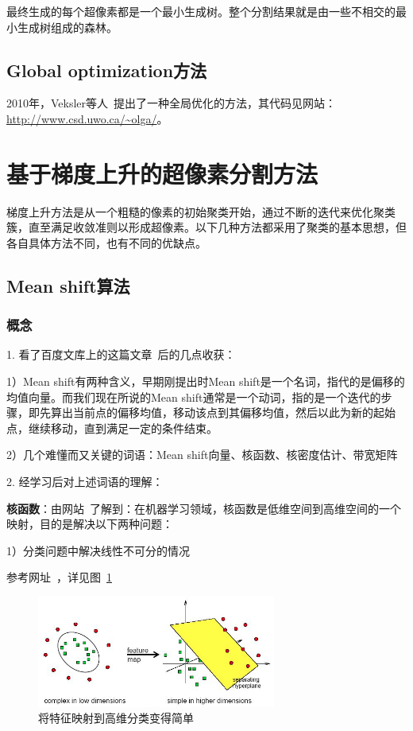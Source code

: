 \documentclass[12pt]{article}
\begin{document}
最终生成的每个超像素都是一个最小生成树。整个分割结果就是由一些不相交的最小生成树组成的森林。

\subsection{Global optimization方法}

2010年，Veksler等人~\cite{veksler2010superpixels}提出了一种全局优化的方法，其代码见网站：\url{http://www.csd.uwo.ca/~olga/}。

\section{基于梯度上升的超像素分割方法}

梯度上升方法是从一个粗糙的像素的初始聚类开始，通过不断的迭代来优化聚类簇，直至满足收敛准则以形成超像素。以下几种方法都采用了聚类的基本思想，但各自具体方法不同，也有不同的优缺点。

\subsection{Mean shift算法}

\subsubsection{概念}

1. 看了百度文库上的这篇文章~\cite{MeanShiftIntroduction}后的几点收获：

1）Mean shift有两种含义，早期刚提出时Mean shift是一个名词，指代的是偏移的均值向量。而我们现在所说的Mean shift通常是一个动词，指的是一个迭代的步骤，即先算出当前点的偏移均值，移动该点到其偏移均值，然后以此为新的起始点，继续移动，直到满足一定的条件结束。

2）几个难懂而又关键的词语：Mean shift向量、核函数、核密度估计、带宽矩阵

2. 经学习后对上述词语的理解： 

\textbf{核函数}：由网站~\cite{KernelFunction}了解到：在机器学习领域，核函数是低维空间到高维空间的一个映射，目的是解决以下两种问题：

1）分类问题中解决线性不可分的情况

参考网址~\cite{KernelExample}，详见图~\ref{fig: kernel}

\begin{figure}[!ht]
\centering
\includegraphics[width=0.7\textwidth]{kernel.png}
\caption{将特征映射到高维分类变得简单}
\label{fig: kernel}
\end{figure} 
\end{document}
